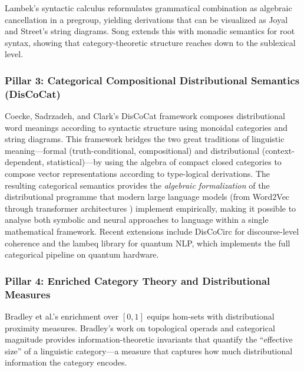\documentclass[
]{article}
\numberwithin{equation}{section}
\begin{document}
Lambek's \citeyearpar{lambek1958mathematics} syntactic calculus
reformulates grammatical combination as algebraic cancellation in a
pregroup, yielding derivations that can be visualized as Joyal and
Street's \citeyearpar{joyalstreet1991geometry} string diagrams. Song
\citeyearpar{song2022act} extends this with monadic semantics for root
syntax, showing that category-theoretic structure reaches down to the
sublexical level.

\subsubsection{Pillar 3: Categorical Compositional Distributional
Semantics
(DisCoCat)}\label{pillar-3-categorical-compositional-distributional-semantics-discocat}

Coecke, Sadrzadeh, and Clark's \citeyearpar{coecke2010mathematical}
DisCoCat framework composes distributional word meanings according to
syntactic structure using monoidal categories and string diagrams. This
framework bridges the two great traditions of linguistic
meaning---formal (truth-conditional, compositional) and distributional
(context-dependent, statistical)---by using the algebra of compact
closed categories to compose vector representations according to
type-logical derivations. The resulting categorical semantics provides
the \emph{algebraic formalization} of the distributional programme that
modern large language models (from Word2Vec \citep{mikolov2013efficient}
through transformer architectures
\citep{vaswani2017attention, devlin2019bert}) implement empirically,
making it possible to analyse both symbolic and neural approaches to
language within a single mathematical framework. Recent extensions
include DisCoCirc \citep{defelice2020discourse, defelice2022discocirc}
for discourse-level coherence and the lambeq library
\citep{lorenz2023lambeq} for quantum NLP, which implements the full
categorical pipeline on quantum hardware.

\subsubsection{Pillar 4: Enriched Category Theory and Distributional
Measures}\label{pillar-4-enriched-category-theory-and-distributional-measures}

Bradley et al.'s \citeyearpar{fritz2021enriched} enrichment over
\([0,1]\) equips hom-sets with distributional proximity measures.
Bradley's
\citetext{\citeyear{bradley2020entropy}; \citeyear{bradley2024ipam}}
work on topological operads and categorical magnitude provides
information-theoretic invariants that quantify the ``effective size'' of
a linguistic category---a measure that captures how much distributional
information the category encodes.
\end{document}
